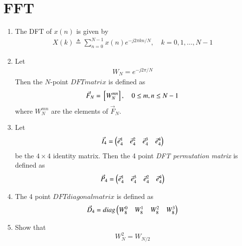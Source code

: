 \documentclass[journal,12pt,twocolumn]{IEEEtran}
\renewcommand\thesection{\arabic{section}}
\begin{document}
    \section{FFT}
    \begin{enumerate}[label=\arabic*.,ref=\thesection.\theenumi]
        \item The DFT of $x(n)$ is given by
        \begin{align}
            X(k) \triangleq \sum_{n=0}^{N-1} x(n) e^{-j 2 \pi k n / N}, \quad k=0,1, \ldots, N-1 \label{def:DFT}
        \end{align}
    \item Let 
      \begin{align}
    W_{N} = e^{-j2\pi/N} \label{eq:twiddle}
      \end{align}
        Then the $N$-point ${ DFT matrix}$ is defined as 
      \begin{align}
        \vec{F}_{N} = {}\left[W_{N}^{mn}\right], \quad 0 \le m,n \le N-1 \label{def:N-point_matrix} 
      \end{align}
      where $W_{N}^{mn}$ are the elements of $\vec{F}_{N}$.
    \item Let 
      \begin{align}
        \vec{I}_4 = \begin{pmatrix}\vec{e}_4^{1} &\vec{e}_4^{2} &\vec{e}_4^{3} &\vec{e}_4^{4} \end{pmatrix}
      \end{align}
        be the $4\times 4$ identity matrix.  Then the 4 point {\em DFT permutation matrix} is defined as 
      \begin{align}
        \vec{P}_4 = \begin{pmatrix}\vec{e}_4^{1} &\vec{e}_4^{3} &\vec{e}_4^{2} &\vec{e}_4^{4} \end{pmatrix} \label{elem_mat}
      \end{align}
    \item The 4 point ${ DFT diagonal matrix}$ is defined as 
      \begin{align}
        \vec{D}_4 = diag\begin{pmatrix}W_{8}^{0} & W_{8}^{1} & W_{8}^{2} & W_{8}^{3}\end{pmatrix} \label{def-diagonal_matrix}
      \end{align}
    \item Show that 
    \begin{equation}
        W_{N}^{2}=W_{N/2}
    \end{equation}

\end{enumerate}
\end{document}
